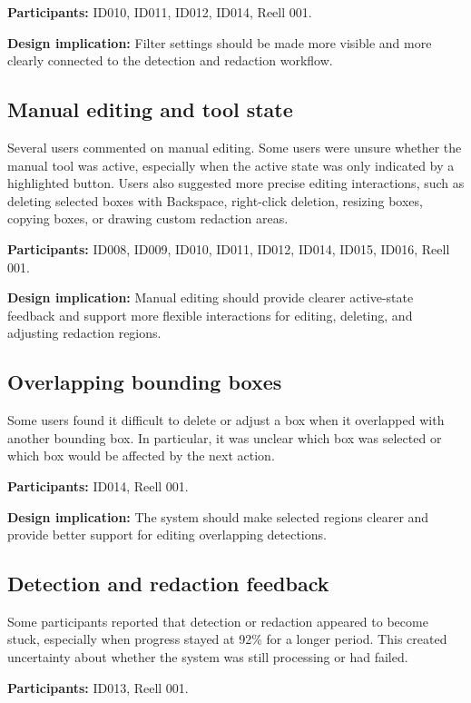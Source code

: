 \textbf{Participants:} ID010, ID011, ID012, ID014, Reell 001.

\textbf{Design implication:} Filter settings should be made more visible and
more clearly connected to the detection and redaction workflow.

\subsection*{Manual editing and tool state}

Several users commented on manual editing. Some users were unsure whether the
manual tool was active, especially when the active state was only indicated by
a highlighted button. Users also suggested more precise editing interactions,
such as deleting selected boxes with Backspace, right-click deletion, resizing
boxes, copying boxes, or drawing custom redaction areas.

\textbf{Participants:} ID008, ID009, ID010, ID011, ID012, ID014, ID015, ID016, Reell 001.

\textbf{Design implication:} Manual editing should provide clearer active-state
feedback and support more flexible interactions for editing, deleting, and
adjusting redaction regions.

\subsection*{Overlapping bounding boxes}

Some users found it difficult to delete or adjust a box when it overlapped with
another bounding box. In particular, it was unclear which box was selected or
which box would be affected by the next action.

\textbf{Participants:} ID014, Reell 001.

\textbf{Design implication:} The system should make selected regions clearer
and provide better support for editing overlapping detections.

\subsection*{Detection and redaction feedback}

Some participants reported that detection or redaction appeared to become stuck,
especially when progress stayed at 92\% for a longer period. This created
uncertainty about whether the system was still processing or had failed.

\textbf{Participants:} ID013, Reell 001.

